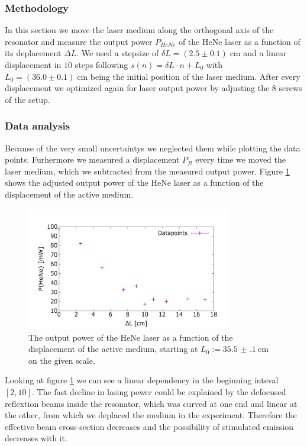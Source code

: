 \documentclass[../main.tex]{subfiles}
\begin{document}
\subsubsection*{Methodology}
    In this section we move the laser medium along the orthogonal axis of the resonator and measure the output power $P_{HeNe}$ of the HeNe laser as a function of its deplacement $\Delta L$. We used a stepsize of $\delta L = (2.5\pm 0.1)\;\si{\cm}$ and a linear displacement in $10$ steps following $s(n) = \delta L\cdot n + L_0$ with $L_0 = (36.0\pm 0.1)\;\si{\cm}$ being the initial position of the laser medium. After every displacement we optimized again for laser output power by adjusting the $8$ screws of the setup. 
\subsubsection*{Data analysis}
    Because of the very small uncertaintys we neglected them while plotting the data points. Furhermore we measured a displacement $P_{fl}$ every time we moved the laser medium, which we subtracted from the measured output power. Figure \ref{fig:output_power_over_displacement} shows the adjusted output power of the HeNe laser as a function of the displacement of the active medium.

    \begin{figure}[H]
        \centering
        \includegraphics[width=0.8\textwidth]{Bilddateien/3/P(HeNe)overDx-adjusted.png}
        \caption{The output power of the HeNe laser as a function of the displacement of the active medium, starting at $L_0:=\SI{35.5(1)}{\cm}$ on the given scale.}
        \label{fig:output_power_over_displacement}
    \end{figure}

    Looking at figure \ref{fig:output_power_over_displacement} we can see a linear dependency in the beginning inteval $[2,10]$. The fast decline in lasing power could be explained by the defocused reflextion beams inside the resonator, which was curved at one end and linear at the other, from which we deplaced the medium in the experiment. Therefore the effective beam cross-section decreases and the possibility of stimulated emission decreases with it.
\end{document}
